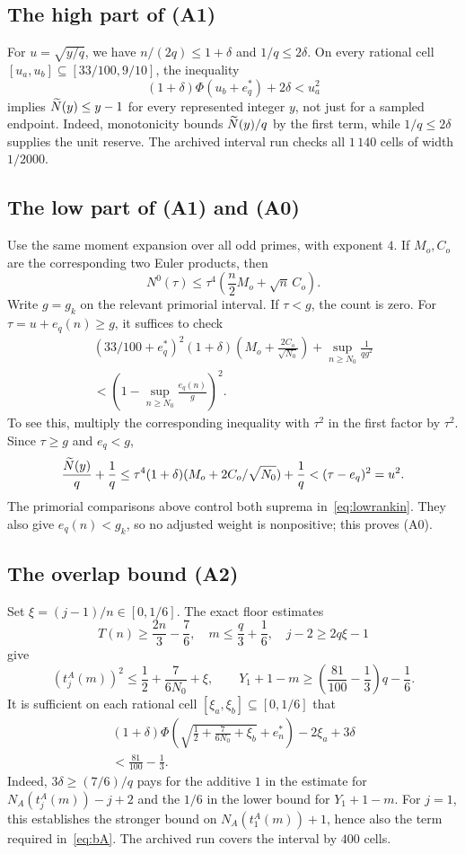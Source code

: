 \subsection{The high part of (A1)}
For $u=\sqrt{y/q}$, we have $n/(2q)\le1+\delta$ and $1/q\le2\delta$. On every rational cell $[u_a,u_b]\subseteq[33/100,9/10]$, the inequality
\begin{equation}\label{eq:highgrid}
 (1+\delta)\Phi(u_b+e_q^*)+2\delta<u_a^2
\end{equation}
implies $\widetilde N(y)\le y-1$ for every represented integer $y$, not just for a sampled endpoint. Indeed, monotonicity bounds $\widetilde N(y)/q$ by the first term, while $1/q\le2\delta$ supplies the unit reserve. The archived interval run checks all $1\,140$ cells of width $1/2000$.

\subsection{The low part of (A1) and (A0)}
Use the same moment expansion over all odd primes, with exponent $4$. If $M_o,C_o$ are the corresponding two Euler products, then
\[
 N^0(\tau)\le\tau^4\left(\frac n2M_o+\sqrt n\,C_o\right).
\]
Write $g=g_k$ on the relevant primorial interval. If $\tau<g$, the count is zero. For $\tau=u+e_q(n)\ge g$, it suffices to check
\begin{multline}\label{eq:lowrankin}
 (33/100+e_q^*)^2(1+\delta)
 \left(M_o+\frac{2C_o}{\sqrt{N_0}}\right)
 +\sup_{n\ge N_0}\frac1{qg^2}\\
 <\left(1-\sup_{n\ge N_0}\frac{e_q(n)}g\right)^2.
\end{multline}
To see this, multiply the corresponding inequality with $\tau^2$ in the first factor by $\tau^2$. Since $\tau\ge g$ and $e_q<g$,
\[
 \frac{\widetilde N(y)}q+\frac1q
 \le \tau^4(1+\delta)(M_o+2C_o/\sqrt{N_0})+\frac1q
 <(\tau-e_q)^2=u^2.
\]
The primorial comparisons above control both suprema in~\eqref{eq:lowrankin}. They also give $e_q(n)<g_k$, so no adjusted weight is nonpositive; this proves (A0).

\subsection{The overlap bound (A2)}
Set $\xi=(j-1)/n\in[0,1/6]$. The exact floor estimates
\[
 T(n)\ge\frac{2n}3-\frac76,\quad
 m\le\frac q3+\frac16,\quad j-2\ge2q\xi-1
\]
give
\[
 (t_j^A(m))^2\le\frac12+\frac7{6N_0}+\xi,
 \qquad Y_1+1-m\ge\left(\frac{81}{100}-\frac13\right)q-\frac16.
\]
It is sufficient on each rational cell $[\xi_a,\xi_b]\subseteq[0,1/6]$ that
\begin{multline}\label{eq:GAgrid}
 (1+\delta)\Phi\left(\sqrt{\frac12+\frac7{6N_0}+\xi_b}+e_n^*\right)
 -2\xi_a+3\delta\\
 <\frac{81}{100}-\frac13.
\end{multline}
Indeed, $3\delta\ge(7/6)/q$ pays for the additive $1$ in the estimate for $N_A(t_j^A(m))-j+2$ and the $1/6$ in the lower bound for $Y_1+1-m$. For $j=1$, this establishes the stronger bound on $N_A(t_1^A(m))+1$, hence also the term required in~\eqref{eq:bA}. The archived run covers the interval by $400$ cells.

